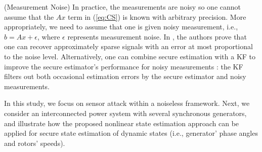 \begin{remark}
(Measurement Noise) In practice, the measurements are noisy so one cannot assume that the $Ax$ term in (\ref{eq:CS}) is known with arbitrary precision. More appropriately, we need to assume that one is given noisy measurement, i.e., $b = Ax + \epsilon$, where $\epsilon$ represents measurement noise. In \cite{Candes_Tao}, the authors prove that one can recover approximately sparse signals with an error at most proportional to the noise level. Alternatively, one can combine secure estimation with a KF to improve the secure estimator's performance for noisy measurements \cite{ctrl_sec9}: the KF filters out both occasional estimation errors by the secure estimator and noisy measurements.
\end{remark}


In this study, we focus on sensor attack within a noiseless framework. Next, we consider an interconnected power system with several synchronous generators, and illustrate how the proposed nonlinear state estimation approach can be applied for secure state estimation of dynamic states (i.e., generator' phase angles and rotors' speeds).


